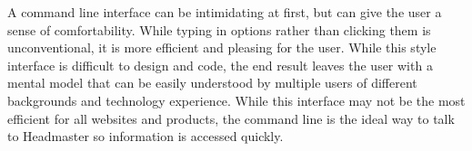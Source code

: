 \documentclass{article}
\begin{document}
	A command line interface can be intimidating at first, but can give the user a sense of comfortability. While typing in options rather than clicking them is unconventional, it is more efficient and pleasing for the user. While this style interface is difficult to design and code, the end result leaves the user with a mental model that can be easily understood by multiple users of different backgrounds and technology experience. While this interface may not be the most efficient for all websites and products, the command line is the ideal way to talk to Headmaster so information is accessed quickly.
	
\pagebreak


\end{document}
